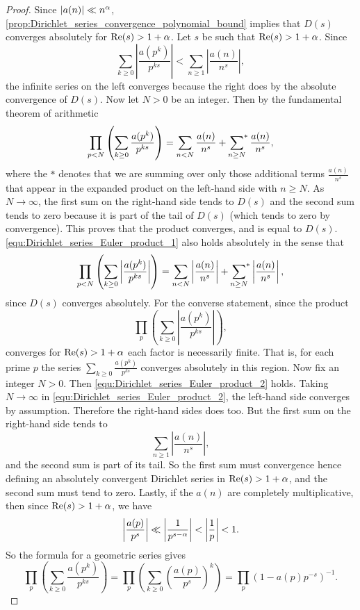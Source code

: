       \begin{proof}
          Since $|a(n)| \ll n^{\alpha}$, \cref{prop:Dirichlet_series_convergence_polynomial_bound} implies that $D(s)$ converges absolutely for $\mathrm{Re}(s) > 1+\alpha$. Let $s$ be such that $\mathrm{Re}(s) > 1+\alpha$. Since
          \[
            \sum_{k \ge 0}\left|\frac{a(p^{k})}{p^{ks}}\right| < \sum_{n \ge 1}\left|\frac{a(n)}{n^{s}}\right|,
          \]
          the infinite series on the left converges because the right does by the absolute convergence of $D(s)$. Now let $N > 0$ be an integer. Then by the fundamental theorem of arithmetic
          \begin{equation}\label{equ:Dirichlet_series_Euler_product_1}
            \prod_{p < N}\left(\sum_{k \ge 0}\frac{a(p^{k})}{p^{ks}}\right) = \sum_{n < N}\frac{a(n)}{n^{s}}+\sideset{}{^{\ast}}\sum_{n \ge N}\frac{a(n)}{n^{s}},
          \end{equation}
          where the $\ast$ denotes that we are summing over only those additional terms $\frac{a(n)}{n^{s}}$ that appear in the expanded product on the left-hand side with $n \ge N$. As $N \to \infty$, the first sum on the right-hand side tends to $D(s)$ and the second sum tends to zero because it is part of the tail of $D(s)$ (which tends to zero by convergence). This proves that the product converges, and is equal to $D(s)$. \cref{equ:Dirichlet_series_Euler_product_1} also holds absolutely in the sense that
          \begin{equation}\label{equ:Dirichlet_series_Euler_product_2}
            \prod_{p < N}\left(\sum_{k \ge 0}\left|\frac{a(p^{k})}{p^{ks}}\right|\right) = \sum_{n < N}\left|\frac{a(n)}{n^{s}}\right|+\sideset{}{^{\ast}}\sum_{n \ge N}\left|\frac{a(n)}{n^{s}}\right|,
          \end{equation}
          since $D(s)$ converges absolutely. For the converse statement, since the product
          \[
            \prod_{p}\left(\sum_{k \ge 0}\left|\frac{a(p^{k})}{p^{ks}}\right|\right),
          \]
          converges for $\mathrm{Re}(s) > 1+\alpha$ each factor is necessarily finite. That is, for each prime $p$ the series $\sum_{k \ge 0}\frac{a(p^{k})}{p^{ks}}$ converges absolutely in this region. Now fix an integer $N > 0$. Then \cref{equ:Dirichlet_series_Euler_product_2} holds. Taking $N \to \infty$ in \cref{equ:Dirichlet_series_Euler_product_2}, the left-hand side converges by assumption. Therefore the right-hand sides does too. But the first sum on the right-hand side tends to
          \[
            \sum_{n \ge 1}\left|\frac{a(n)}{n^{s}}\right|,
          \]
          and the second sum is part of its tail. So the first sum must convergence hence defining an absolutely convergent Dirichlet series in $\mathrm{Re}(s) > 1+\alpha$, and the second sum must tend to zero. Lastly, if the $a(n)$ are completely multiplicative, then since $\mathrm{Re}(s) > 1+\alpha$, we have
          \[
            \left|\frac{a(p)}{p^{s}}\right| \ll \left|\frac{1}{p^{s-\alpha}}\right| < \left|\frac{1}{p}\right| < 1.
          \]
          So the formula for a geometric series gives
          \[
            \prod_{p}\left(\sum_{k \ge 0}\frac{a(p^{k})}{p^{ks}}\right) = \prod_{p}\left(\sum_{k \ge 0}\left(\frac{a(p)}{p^{s}}\right)^{k}\right) = \prod_{p}(1-a(p)p^{-s})^{-1}.
          \]
      \end{proof}

